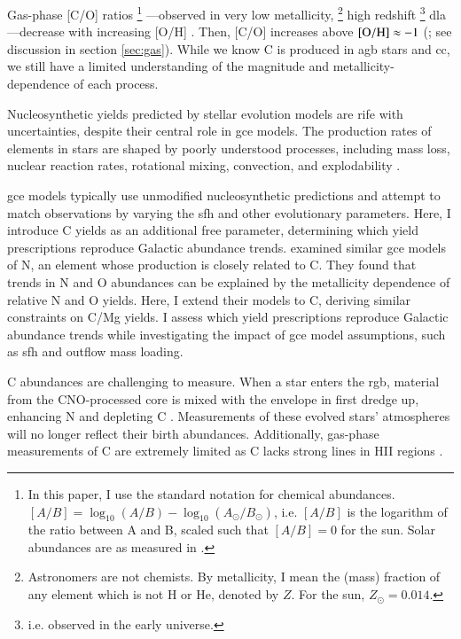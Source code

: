 \documentclass[12pt,oneside,letterpaper]{report}
\newcommand{\cc}{\gls{cc}}
\newcommand{\agb}{\gls{agb}}
\newcommand{\sfh}{\gls{sfh}}
\newcommand{\dla}{\gls{dla}}
\newcommand{\gce}{\gls{gce}}
\newcommand{\Gce}{\Gls{gce}}
\newcommand{\sun}{\odot}
\begin{document}
Gas-phase [C/O] ratios%
%
\footnote{In this paper, I use the standard notation for chemical abundances. $[A/B] = \log_{10}\left(A/B\right) - \log_{10}\left(A_{\sun}/B_{\sun}\right)$, i.e. $[A/B]$ is the logarithm of the ratio between A and B, scaled such that $[A/B]=0$ for the sun. Solar abundances are as measured in \citet{asplund+09}.}%
%
---observed in very low \gls{metallicity},%
\footnote{Astronomers are not chemists. By metallicity, I mean the (mass) fraction of any element which is not H or He, denoted by $Z$. For the sun, $Z_\odot=0.014$. }
 high redshift%
\footnote{i.e. observed in the early universe.}
\dla{}---decrease with increasing [O/H] \citep{FN15, cooke+17}. Then, [C/O] increases above $\rm [O/H] \approx -1$ (\citealt{berg+19}; see discussion in section \ref{sec:gas}).
While we know C is produced in \agb{} stars and \cc{}, we still have a limited understanding of the magnitude and metallicity-dependence of each process.


Nucleosynthetic yields predicted by stellar evolution models are rife with uncertainties, despite their central role in \gce{} models. The production rates of elements in stars are shaped by poorly understood processes, including mass loss, nuclear reaction rates, rotational mixing, convection, and explodability \citep{KL14,ventura+13, LC18, emily+21}.

\Gce{} models typically use unmodified nucleosynthetic predictions and attempt to match observations by varying the \sfh{} and other evolutionary parameters. Here, I introduce C yields as an additional free parameter, determining which yield prescriptions reproduce Galactic abundance trends.
\cite{james+23} examined similar \gce{} models of N, an element whose production is closely related to C. They  found that trends in N and O abundances can be explained by the \gls{metallicity} dependence of relative N and O yields. Here, I extend their models to C, deriving similar constraints on C/Mg yields. I assess which yield prescriptions reproduce Galactic abundance trends while investigating the impact of \gce{} model assumptions, such as \sfh{} and outflow mass loading.

C abundances are challenging to measure. When a star enters the \gls{rgb}, material from the CNO-processed core is mixed with the envelope in first dredge up, enhancing N and depleting C \citep{iben67, vincenzo+21,KL14}. Measurements of these evolved stars'  atmospheres will no longer reflect their birth abundances.  Additionally, gas-phase measurements of C are extremely limited as C lacks strong lines in HII regions \citep{skillman+20}.
\end{document}

